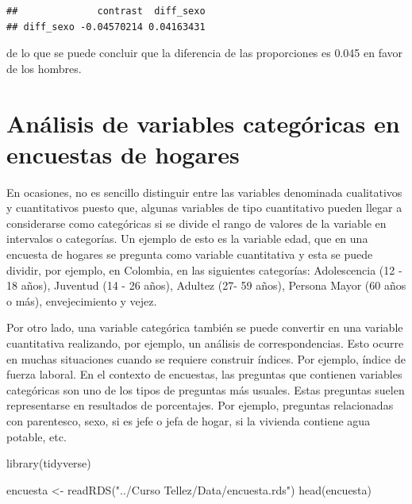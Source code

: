 \documentclass[
  12pt,
]{book}
\newenvironment{Shaded}{\begin{snugshade}}{\end{snugshade}}
\newcommand{\FunctionTok}[1]{\textcolor[rgb]{0.00,0.00,0.00}{#1}}
\newcommand{\NormalTok}[1]{#1}
\newcommand{\OtherTok}[1]{\textcolor[rgb]{0.56,0.35,0.01}{#1}}
\newcommand{\StringTok}[1]{\textcolor[rgb]{0.31,0.60,0.02}{#1}}
\begin{document}
\begin{verbatim}
##              contrast  diff_sexo
## diff_sexo -0.04570214 0.04163431
\end{verbatim}

de lo que se puede concluir que la diferencia de las proporciones es 0.045 en favor de los hombres.

\hypertarget{anuxe1lisis-de-variables-categuxf3ricas-en-encuestas-de-hogares}{%
\chapter{Análisis de variables categóricas en encuestas de hogares}\label{anuxe1lisis-de-variables-categuxf3ricas-en-encuestas-de-hogares}}

En ocasiones, no es sencillo distinguir entre las variables denominada cualitativos y cuantitativos puesto que, algunas variables de tipo cuantitativo pueden llegar a considerarse como categóricas si se divide el rango de valores de la variable en intervalos o categorías. Un ejemplo de esto es la variable edad, que en una encuesta de hogares se pregunta como variable cuantitativa y esta se puede dividir, por ejemplo, en Colombia, en las siguientes categorías: Adolescencia (12 - 18 años), Juventud (14 - 26 años), Adultez (27- 59 años), Persona Mayor (60 años o más), envejecimiento y vejez.

Por otro lado, una variable categórica también se puede convertir en una variable cuantitativa realizando, por ejemplo, un análisis de correspondencias. Esto ocurre en muchas situaciones cuando se requiere construir índices. Por ejemplo, índice de fuerza laboral. En el contexto de encuestas, las preguntas que contienen variables categóricas son uno de los tipos de preguntas más usuales. Estas preguntas suelen representarse en resultados de porcentajes. Por ejemplo, preguntas relacionadas con parentesco, sexo, si es jefe o jefa de hogar, si la vivienda contiene agua potable, etc.

\begin{Shaded}
\begin{Highlighting}[]
\FunctionTok{library}\NormalTok{(tidyverse)}

\NormalTok{encuesta }\OtherTok{\textless{}{-}} \FunctionTok{readRDS}\NormalTok{(}\StringTok{"../Curso Tellez/Data/encuesta.rds"}\NormalTok{)}
\FunctionTok{head}\NormalTok{(encuesta)}
\end{Highlighting}
\end{Shaded}
\end{document}
